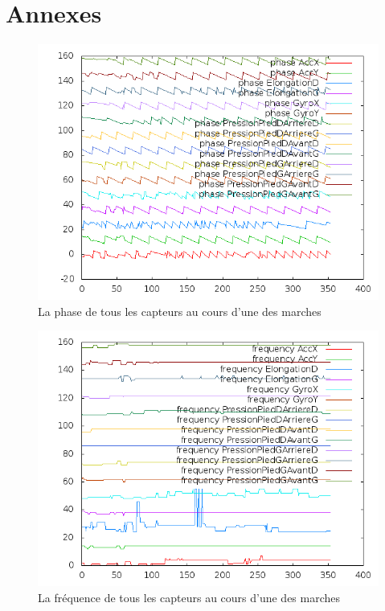 \documentclass[11pt]{article}
\begin{document}
\section{Annexes}
\begin{figure}[h]
    \includegraphics[scale=0.5]{all_sensor_phases.png}
    \caption{La phase de tous les capteurs au cours d'une des marches}
\end{figure}
\begin{figure}[h]
    \includegraphics[scale=0.5]{all_sensor_freq.png}
    \caption{La fréquence de tous les capteurs au cours d'une des marches}
\end{figure}
\end{document}
